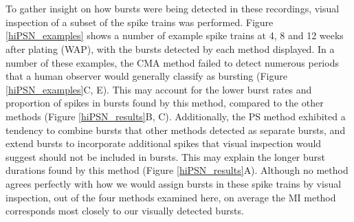 \documentclass[12pt, titlepage]{article}
\begin{document}
\\ \\ To gather insight on how bursts were being detected in these recordings, visual inspection of a subset of the spike trains was performed.  Figure \ref{hiPSN_examples} shows a number of example spike trains at 4, 8 and 12 weeks after plating (WAP), with the bursts detected by each method displayed. In a number of these examples, the CMA method failed to detect numerous periods that a human observer would generally classify as bursting (Figure \ref{hiPSN_examples}C, E). This may account for the lower burst rates and proportion of spikes in bursts found by this method, compared to the other methods (Figure \ref{hiPSN_results}B, C). Additionally, the PS method exhibited a tendency to combine bursts that other methods detected as separate bursts, and extend bursts to incorporate additional spikes that visual inspection would suggest should not be included in bursts. This may explain the longer burst durations found by this method (Figure \ref{hiPSN_results}A). Although no method agrees perfectly with how we would assign bursts in these spike trains by visual inspection, out of the four methods examined here, on average the MI method corresponds most closely to our visually detected bursts. 
\end{document}
